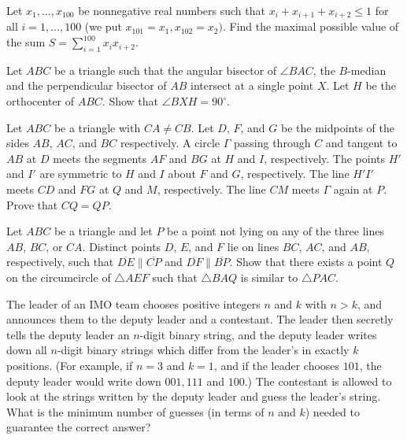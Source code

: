 \documentclass[11pt]{scrartcl}
\begin{document}
\begin{problem}[1862468241301875616]
	Let $x_1, \ldots , x_{100}$ be nonnegative real numbers such that $x_i + x_{i+1} + x_{i+2} \leq 1$ for all $i = 1, \ldots , 100$ (we put $x_{101 } = x_1, x_{102} = x_2).$ Find the maximal possible value of the sum $S = \sum^{100}_{i=1} x_i x_{i+2}.$
\end{problem}
\begin{problem}[264456837378391]
Let $ABC$ be a triangle such that the angular bisector of $\angle BAC$, the $B$-median and the perpendicular bisector of $AB$ intersect at a single point $X$. Let $H$ be the orthocenter of $ABC$. Show that $\angle BXH = 90^{\circ}$.
\end{problem}
\begin{problem}[572967976964328]
	Let $ABC$ be a triangle with $CA \neq CB$. Let $D$, $F$, and $G$ be the midpoints of the sides $AB$, $AC$, and $BC$ respectively. A circle $\Gamma$ passing through $C$ and tangent to $AB$ at $D$ meets the segments $AF$ and $BG$ at $H$ and $I$, respectively. The points $H'$ and $I'$ are symmetric to $H$ and $I$ about $F$ and $G$, respectively. The line $H'I'$ meets $CD$ and $FG$ at $Q$ and $M$, respectively. The line $CM$ meets $\Gamma$ again at $P$. Prove that $CQ = QP$.
\end{problem}
\begin{problem}[7203789790519658258]
Let $ABC$ be a triangle and let $P$ be a point not lying on any of the three lines $AB$, $BC$, or $CA$. Distinct points $D$, $E$, and $F$ lie on lines $BC$, $AC$, and $AB$, respectively, such that $\overline{DE}\parallel \overline{CP}$ and $\overline{DF}\parallel \overline{BP}$. Show that there exists a point $Q$ on the circumcircle of $\triangle AEF$ such that $\triangle BAQ$ is similar to $\triangle PAC$.
\end{problem}
\begin{problem}[175119746688413]
	The leader of an IMO team chooses positive integers $n$ and $k$ with $n > k$, and announces them to the deputy leader and a contestant. The leader then secretly tells the deputy leader an $n$-digit binary string, and the deputy leader writes down all $n$-digit binary strings which differ from the leader’s in exactly $k$ positions. (For example, if $n = 3$ and $k = 1$, and if the leader chooses $101$, the deputy leader would write down $001, 111$ and $100$.) The contestant is allowed to look at the strings written by the deputy leader and guess the leader’s string. What is the minimum number of guesses (in terms of $n$ and $k$) needed to guarantee the correct answer?
\end{problem}
\end{document}

